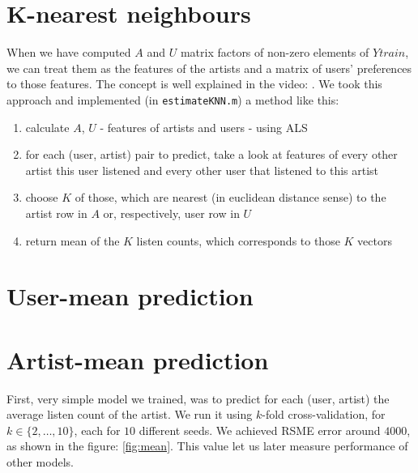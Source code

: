 \documentclass{report}
\begin{document}
\section{K-nearest neighbours}
When we have computed $A$ and $U$ matrix factors of non-zero elements of $Ytrain$, we can treat them as the features of the artists and a matrix of users' preferences to those features. The concept is well explained in the video: \cite{cfng}. We took this approach and implemented (in \texttt{estimateKNN.m}) a method like this:
\begin{enumerate}
\item calculate $A$, $U$ - features of artists and users - using ALS
\item for each (user, artist) pair to predict, take a look at features of every other artist this user listened and every other user that listened to this artist
\item choose $K$ of those, which are nearest (in euclidean distance sense) to the artist row in $A$ or, respectively, user row in $U$
\item return mean of the $K$ listen counts, which corresponds to those $K$ vectors
\end{enumerate}


\section{User-mean prediction}

\iffalse
\section{Artist-mean prediction}
First, very simple model we trained, was to predict for each (user, artist) the average listen count of the artist. %
 We run it using $k$-fold cross-validation, for $k\in\{2,\ldots, 10\}$, each for $10$ different seeds. We achieved RSME error around $4000$, as shown in the figure: \ref{fig:mean}. This value let us later measure performance of other models. 
 
\end{document}
